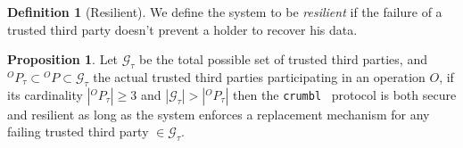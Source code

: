 \documentclass[twoside,twocolumn]{article}
\theoremstyle{definition}
\newtheorem{definition}{Definition}
\newtheorem{proposition}{Proposition}
\theoremstyle{remark}
\begin{document}
\begin{definition}[Resilient]
    \label{resilient}
    We define the system to be \emph{resilient} if the failure of a trusted third party doesn't prevent a holder to recover his data.
\end{definition}

\begin{proposition}
    \label{prop:ttp3}
    Let $\mathcal{G}_\tau$ be the total possible set of trusted third parties, and ${}^OP_\tau \subset {}^OP \subset \mathcal{G}_\tau$ the actual 
    trusted third parties participating in an operation $O$, if its cardinality $|{}^OP_\tau| \geq 3$ and $|\mathcal{G}_\tau| > |{}^OP_\tau|$ then the 
    \texttt{crumbl}\texttrademark~ protocol is both secure and resilient as long as the system enforces a replacement mechanism for any failing trusted 
    third party $\in \mathcal{G}_\tau$.
\end{proposition}
\end{document}
